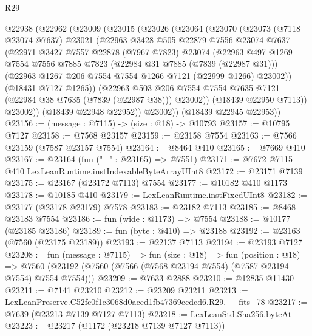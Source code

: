 \begin{lexlean}{R29}
\begin{coremodule}
  @22938
    (@22962
      (@23009
        (@23015
          (@23026
            (@23064
              (@23070
                (@23073
                  (@7118 @23074 @7637)
                  @23021
                  (@22963
                    @3428
                    @505
                    @22879
                    @7556
                    @23074
                    @7637
                    (@22971
                      @3427
                      @7557
                      @22878
                      (@7967 @7823)
                      @23074
                      (@22963
                        @497
                        @1269
                        @7554
                        @7556
                        @7885
                        @7823
                        (@22984 @31 @7885 (@7839 (@22987 @31)))
                        (@22963 @1267 @206 @7554 @7554 @1266 @7121 (@22999 @1266) @23002))
                      (@18431 @7127 @1265))
                    (@22963
                      @503
                      @206
                      @7554
                      @7554
                      @7635
                      @7121
                      (@22984 @38 @7635 (@7839 (@22987 @38)))
                      @23002))
                  (@18439 @22950 @7113))
                @23002))
            (@18439 @22948 @22952))
          @23002))
      (@18439 @22945 @22953))
@23156 := (message : @7115) -> (size : @18) -> @10793
@23157 := @10795 @7127
@23158 := @7568 @23157
@23159 := @23158 @7554
@23163 := @7566 @23159 (@7587 @23157 @7554)
@23164 := @8464 @410
@23165 := @7669 @410
@23167 := @23164 (fun ("_" : @23165) => @7551)
@23171 := @7672 @7115 @410 LexLeanRuntime.instIndexableByteArrayUInt8
@23172 := @23171 @7139
@23175 := @23167 (@23172 @7113) @7554
@23177 := @10182 @410 @1173
@23178 := @10185 @410
@23179 := LexLeanRuntime.instFixedUInt8
@23182 := @23177 (@23178 @23179) @7578
@23183 := @23182 @7113
@23185 := @8468 @23183 @7554
@23186 := fun (wide : @1173) => @7554
@23188 := @10177 (@23185 @23186)
@23189 := fun (byte : @410) => @23188
@23192 := @23163 (@7560 (@23175 @23189))
@23193 := @22137 @7113
@23194 := @23193 @7127
@23208 := fun (message : @7115) =>
  fun (size : @18) =>
  fun (position : @18) =>
  @7560 (@23192 (@7560 (@7566 (@7568 @23194 @7554) (@7587 @23194 @7554) @7554 @7554)))
@23209 := @7633 @2888
@23210 := @12835 @11430
@23211 := @7141 @23210
@23212 := @23209 @23211
@23213 := LexLeanPreserve.C52fc0f1c3068d0aced1fb47369ccdcd6.R29.__fits_78
@23217 := @7639 (@23213 @7139 @7127 @7113)
@23218 := LexLeanStd.Sha256.byteAt
@23223 := @23217 (@1172 (@23218 @7139 @7127 @7113))

\end{coremodule}
\end{lexlean}
